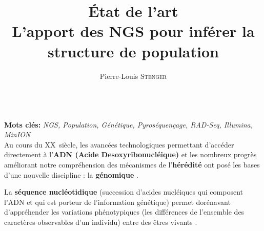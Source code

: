 \documentclass[a4paper,11pt,twoside]{report}
\title{{\Huge État de l'art}\\[3pc]L'apport des NGS pour inférer la structure de population}
\author{Pierre-Louis \textsc{Stenger}}
\date{}
\begin{document}
	
\onehalfspacing %



\frontmatter

\maketitle 

\listoffigures  %

\mainmatter





~~\\
\textbf{Mots clés:} \emph{NGS, Population, Génétique, Pyroséquençage, RAD-Seq, Illumina, MinION}
~~\\

Au cours du \textsc{XX}\ieme~siècle, les avancées technologiques permettant d’accéder directement à l’\textbf{ADN (Acide Desoxyribonucléique)} et les nombreux progrès améliorant notre compréhension des mécanismes de l’\textbf{hérédité} ont posé les bases d’une nouvelle discipline : la \textbf{génomique} \citep{eggen2003approches}. 

La \textbf{séquence nucléotidique} (succession d'acides nucléiques qui composent l'ADN et qui est porteur de l'information génétique) permet dorénavant d'appréhender les variations phénotypiques (les différences de l'ensemble des caractères observables d'un individu) entre des êtres vivants \citep{champe1962reversal}.
\end{document}
